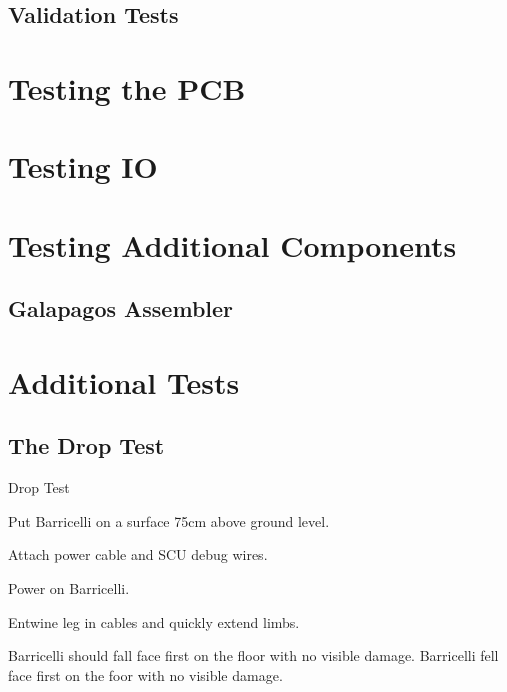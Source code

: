 \subsection{Validation Tests}

\section{Testing the PCB}


\section{Testing IO}

\section{Testing Additional Components}

\subsection{Galapagos Assembler}


\section{Additional Tests}

\subsection{The Drop Test}

\test
{Drop Test}{
    \item{Put Barricelli on a surface 75cm above ground level.}
    \item{Attach power cable and SCU debug wires.}
    \item{Power on Barricelli.}
    \item{Entwine leg in cables and quickly extend limbs.}
}{Barricelli should fall face first on the floor with no visible damage.}
{Barricelli fell face first on the foor with no visible damage.}



